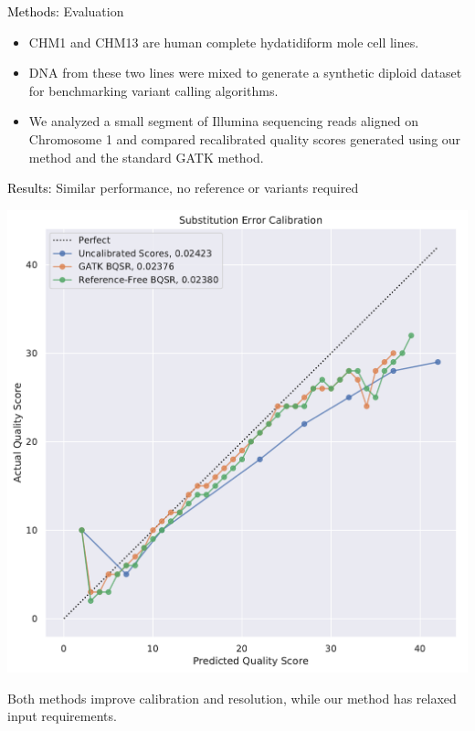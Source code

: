 \documentclass{beamer}
\begin{document}
\begin{frame}{}
\begin{columns}[T]
\begin{column}[T]{.5\linewidth}
\begin{block}{\textcolor{black}{Methods:} Evaluation}
\begin{itemize}
	\item CHM1 and CHM13 are human complete hydatidiform mole cell lines.
	\item DNA from these two lines were mixed to generate a synthetic diploid dataset for benchmarking variant calling algorithms.
	\item We analyzed a small segment of Illumina sequencing reads aligned on Chromosome 1 and compared recalibrated quality scores generated using our method and the standard GATK method.
\end{itemize}
\end{block}

\begin{block}{\textcolor{black}{Results:} Similar performance, no reference or variants required}
\begin{center}
\includegraphics[width=.9\textwidth]{qualscores.pdf}
\end{center}
Both methods improve calibration and resolution, while our method has relaxed input requirements.
\end{block}


\end{column}
\end{columns}
\end{frame}
\end{document}
